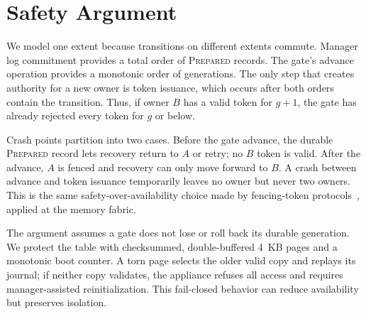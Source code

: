 \section{Safety Argument}
\label{sec:safety}

We model one extent because transitions on different extents commute. Manager
log commitment provides a total order of \textsc{Prepared} records. The gate's
advance operation provides a monotonic order of generations. The only step that
creates authority for a new owner is token issuance, which occurs after both
orders contain the transition. Thus, if owner $B$ has a valid token for
$g+1$, the gate has already rejected every token for $g$ or below.

Crash points partition into two cases. Before the gate advance, the durable
\textsc{Prepared} record lets recovery return to $A$ or retry; no $B$ token is
valid. After the advance, $A$ is fenced and recovery can only move forward to
$B$. A crash between advance and token issuance temporarily leaves no owner but
never two owners. This is the same safety-over-availability choice made by
fencing-token protocols~\cite{burrows2006chubby}, applied at the memory fabric.

The argument assumes a gate does not lose or roll back its durable generation.
We protect the table with checksummed, double-buffered 4~KB pages and a monotonic
boot counter. A torn page selects the older valid copy and replays its journal;
if neither copy validates, the appliance refuses all access and requires
manager-assisted reinitialization. This fail-closed behavior can reduce
availability but preserves isolation.
